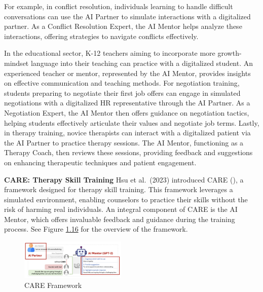 \documentclass[
  letterpaper,
  DIV=11,
  numbers=noendperiod,
  oneside]{scrreprt}
\theoremstyle{remark}
\begin{document}
For example, in conflict resolution, individuals learning to handle
difficult conversations can use the AI Partner to simulate interactions
with a digitalized partner. As a Conflict Resolution Expert, the AI
Mentor helps analyze these interactions, offering strategies to navigate
conflicts effectively.

In the educational sector, K-12 teachers aiming to incorporate more
growth-mindset language into their teaching can practice with a
digitalized student. An experienced teacher or mentor, represented by
the AI Mentor, provides insights on effective communication and teaching
methods. For negotiation training, students preparing to negotiate their
first job offers can engage in simulated negotiations with a digitalized
HR representative through the AI Partner. As a Negotiation Expert, the
AI Mentor then offers guidance on negotiation tactics, helping students
effectively articulate their values and negotiate job terms. Lastly, in
therapy training, novice therapists can interact with a digitalized
patient via the AI Partner to practice therapy sessions. The AI Mentor,
functioning as a Therapy Coach, then reviews these sessions, providing
feedback and suggestions on enhancing therapeutic techniques and patient
engagement.

\textbf{CARE: Therapy Skill Training} Hsu et al.~(2023) introduced CARE
(), a framework designed
for therapy skill training. This framework leverages a simulated
environment, enabling counselors to practice their skills without the
risk of harming real individuals. An integral component of CARE is the
AI Mentor, which offers invaluable feedback and guidance during the
training process. See Figure \hyperref[fig:care]{1.16} for the overview
of the framework.

\begin{figure}

{\centering \includegraphics[width=0.45\textwidth,height=\textheight]{Figures/care.png}

}

\caption{CARE Framework}

\end{figure}%
\end{document}
